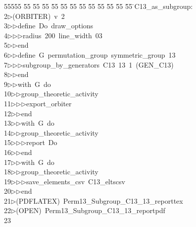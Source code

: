 %
%
\begin{tabbing}
55555 \= 55 \= 55 \= 55 \= 55 \= 55 \= 55 \= 55 \= 55 \= 55 \= 55 \= 55 \= 55 \= \>C13\_as\_subgroup:\\[0pt]
2\>$\triangleright$\>(ORBITER)\ v\ 2\ \\[0pt]
3\>$\triangleright$\>$\triangleright$\>define\ Do\ draw\_options\ \\[0pt]
4\>$\triangleright$\>$\triangleright$\>$\triangleright$\>radius\ 200\ line\_width\ 03\ \\[0pt]
5\>$\triangleright$\>$\triangleright$\>end\ \\[0pt]
6\>$\triangleright$\>$\triangleright$\>define\ G\ permutation\_group\ symmetric\_group\ 13\ \\[0pt]
7\>$\triangleright$\>$\triangleright$\>$\triangleright$\>subgroup\_by\_generators\ C13\ 13\ 1\ (GEN\_C13)\ \\[0pt]
8\>$\triangleright$\>$\triangleright$\>end\ \\[0pt]
9\>$\triangleright$\>$\triangleright$\>with\ G\ do\ \\[0pt]
10\>$\triangleright$\>$\triangleright$\>group\_theoretic\_activity\ \\[0pt]
11\>$\triangleright$\>$\triangleright$\>$\triangleright$\>export\_orbiter\ \\[0pt]
12\>$\triangleright$\>$\triangleright$\>end\ \\[0pt]
13\>$\triangleright$\>$\triangleright$\>with\ G\ do\ \\[0pt]
14\>$\triangleright$\>$\triangleright$\>group\_theoretic\_activity\ \\[0pt]
15\>$\triangleright$\>$\triangleright$\>$\triangleright$\>report\ Do\ \\[0pt]
16\>$\triangleright$\>$\triangleright$\>end\ \\[0pt]
17\>$\triangleright$\>$\triangleright$\>with\ G\ do\ \\[0pt]
18\>$\triangleright$\>$\triangleright$\>group\_theoretic\_activity\ \\[0pt]
19\>$\triangleright$\>$\triangleright$\>$\triangleright$\>save\_elements\_csv\ C13\_eltscsv\ \\[0pt]
20\>$\triangleright$\>$\triangleright$\>end\\[0pt]
21\>$\triangleright$\>(PDFLATEX)\ Perm13\_Subgroup\_C13\_13\_reporttex\\[0pt]
22\>$\triangleright$\>(OPEN)\ Perm13\_Subgroup\_C13\_13\_reportpdf\\[0pt]
23\>\end{tabbing}

